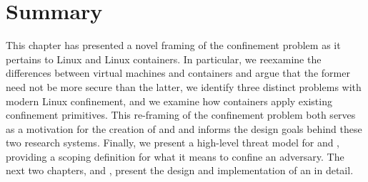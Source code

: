 \section{Summary}

This chapter has presented a novel framing of the confinement problem as it pertains to
Linux and Linux containers. In particular, we reexamine the differences between virtual
machines and containers and argue that the former need not be more secure than the latter,
we identify three distinct problems with modern Linux confinement, and we examine how
containers apply existing confinement primitives. This re-framing of the confinement
problem both serves as a motivation for the creation of \bpfbox{} and \bpfcontain{} and
informs the design goals behind these two research systems. Finally, we present
a high-level threat model for \bpfbox{} and \bpfcontain{}, providing a scoping definition
for what it means to confine an adversary. The next two chapters,  and
, present the design and implementation of \bpfbox{} an \bpfcontain{} in
detail.

